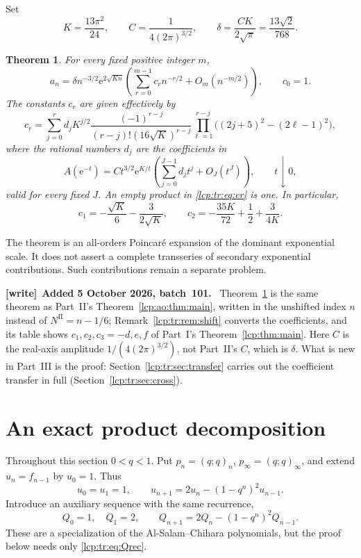 \documentclass[11pt]{article}
\numberwithin{equation}{section}
\newtheorem{theorem}{Theorem}[section]
\theoremstyle{definition}\newtheorem{definition}[theorem]{Definition}
\theoremstyle{remark}\newtheorem{remark}[theorem]{Remark}
\newcommand{\ee}{\mathrm e}
\newenvironment{writenote}[1][]{\par\smallskip\begingroup\small
 \noindent\textbf{[write]}\if\relax\detokenize{#1}\relax\else~\textbf{#1.}\fi\ }%
 {\par\endgroup\smallskip}
\begin{document}
Set
\begin{equation}\label{lcp:tr:eq:constants}
 K=\frac{13\pi^2}{24},\qquad C=\frac{1}{4(2\pi)^{3/2}},\qquad
 \delta=\frac{CK}{2\sqrt\pi}=\frac{13\sqrt2}{768}.
\end{equation}
\begin{theorem}\label{lcp:tr:thm:main}
For every fixed positive integer $m$,
\begin{equation}\label{lcp:tr:eq:allcoeff}
 a_n=\delta n^{-3/2}\ee^{2\sqrt{Kn}}
 \left(\sum_{r=0}^{m-1}c_r n^{-r/2}+O_m(n^{-m/2})\right),
 \qquad c_0=1.
\end{equation}
The constants $c_r$ are given effectively by
\begin{equation}\label{lcp:tr:eq:cr}
 c_r=\sum_{j=0}^r d_jK^{j/2}
 \frac{(-1)^{r-j}}{(r-j)!(16\sqrt K)^{r-j}}
 \prod_{\ell=1}^{r-j}\bigl((2j+5)^2-(2\ell-1)^2\bigr),
\end{equation}
where the rational numbers $d_j$ are the coefficients in
\begin{equation}\label{lcp:tr:eq:realexp}
 A(\ee^{-t})=Ct^{3/2}\ee^{K/t}
 \left(\sum_{j=0}^{J-1}d_jt^j+O_J(t^J)\right),\qquad t\downarrow0,
\end{equation}
valid for every fixed $J$. An empty product in \eqref{lcp:tr:eq:cr} is one. In particular,
\[
 c_1=-\frac{\sqrt K}{6}-\frac{3}{2\sqrt K},\qquad
 c_2=-\frac{35K}{72}+\frac12+\frac{3}{4K}.
\]
\end{theorem}
The theorem is an all-orders Poincar\'e expansion of the dominant exponential scale. It does not assert a complete transseries of secondary exponential contributions. Such contributions remain a separate problem.

\begin{writenote}[Added 5 October 2026, batch~101]
Theorem~\ref{lcp:tr:thm:main} is the same theorem as Part~II's
Theorem~\ref{lcp:ao:thm:main}, written in the unshifted index $n$ instead
of $N^{\mathrm{II}}=n-1/6$; Remark~\ref{lcp:tr:rem:shift} converts the
coefficients, and its table shows $c_1,c_2,c_3=-d,e,f$ of Part~I's
Theorem~\ref{lcp:thm:main}. Here $C$ is the real-axis amplitude
$1/(4(2\pi)^{3/2})$, not Part~II's $C$, which is $\delta$. What is new in
Part~III is the proof: Section~\ref{lcp:tr:sec:transfer} carries out the
coefficient transfer in full (Section~\ref{lcp:tr:sec:cross}).
\end{writenote}


\section{An exact product decomposition}\label{lcp:tr:sec:product}
Throughout this section $0<q<1$. Put $p_n=(q;q)_n$, $p_\infty=(q;q)_\infty$, and extend $u_n=f_{n-1}$ by $u_0=1$. Thus
\begin{equation}\label{lcp:tr:eq:urec}
 u_0=u_1=1,\qquad u_{n+1}=2u_n-(1-q^n)^2u_{n-1}.
\end{equation}
Introduce an auxiliary sequence with the same recurrence,
\begin{equation}\label{lcp:tr:eq:Qrec}
 Q_0=1,\quad Q_1=2,\qquad Q_{n+1}=2Q_n-(1-q^n)^2Q_{n-1}.
\end{equation}
These are a specialization of the Al-Salam--Chihara polynomials, but the proof below needs only \eqref{lcp:tr:eq:Qrec}.
\end{document}
